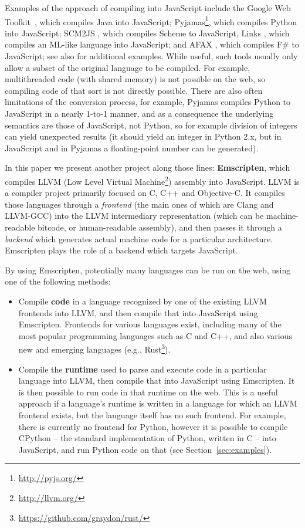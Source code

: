 \documentclass[preprint,10pt]{sigplanconf}
\begin{document}
Examples of the approach of compiling into JavaScript include
the Google Web Toolkit~\cite{gwt}, which compiles Java into JavaScript;
Pyjamas\footnote{\url{http://pyjs.org/}}, which compiles Python into JavaScript;
SCM2JS \cite{hop}, which compiles Scheme to JavaScript,
Links \cite{links}, which compiles an ML-like language into JavaScript;
and AFAX \cite{afax}, which compiles F\# to JavaScript;
see also \cite{ashkenas} for additional examples.
While useful, such tools usually only allow a subset of the original language to
be compiled. For example, multithreaded code (with shared memory) is
not possible on the web, so compiling code of that sort is
not directly possible. There are also often limitations of the conversion
process, for example, Pyjamas compiles Python to JavaScript in a nearly
1-to-1 manner, and as a consequence the underlying semantics are those of JavaScript,
not Python, so for example division of integers can yield unexpected results
(it should yield an integer in Python 2.x,
but in JavaScript and in Pyjamas a floating-point number can be generated).

In this paper we present another project along those lines: \textbf{Emscripten},
which compiles LLVM (Low Level Virtual Machine\footnote{\url{http://llvm.org/}}) assembly into JavaScript.
LLVM is a compiler project primarily focused on C, C++ and
Objective-C. It compiles those languages through a \emph{frontend} (the
main ones of which are Clang and LLVM-GCC) into the
LLVM intermediary representation (which can be machine-readable
bitcode, or human-readable assembly), and then passes it
through a \emph{backend} which generates actual machine code for a particular
architecture. Emscripten plays the role of a backend which targets JavaScript.

By using Emscripten, potentially many languages can be
run on the web, using one of the following methods:
\begin{itemize}
\item Compile \textbf{code} in a language recognized by one of the existing LLVM frontends
      into LLVM, and then compile that
      into JavaScript using Emscripten. Frontends for various languages
      exist, including many of the most popular programming languages such as C and
      C++, and also various new and emerging languages (e.g., Rust\footnote{\url{https://github.com/graydon/rust/}}).
\item Compile the \textbf{runtime} used to parse and execute code in
      a particular language into LLVM, then compile that into JavaScript using
      Emscripten. It is then possible to run code in that runtime on the web.
      This is a useful approach if
      a language's runtime is written in a language for which an LLVM
      frontend exists, but the language itself has no such frontend. For
      example, there is currently no frontend for Python, however
      it is possible to compile CPython -- the standard implementation of
      Python, written in C -- into JavaScript, and run Python code on that
      (see Section~\ref{sec:examples}).
\end{itemize}
\end{document}
